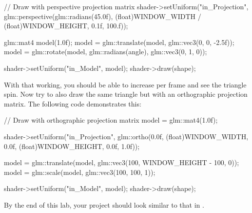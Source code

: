 \documentclass[10pt]{article}
\begin{document}
\begin{Code}

// Draw with perspective projection matrix
shader->setUniform("in_Projection", glm::perspective(glm::radians(45.0f),
 (float)WINDOW_WIDTH / (float)WINDOW_HEIGHT, 0.1f, 100.f));

glm::mat4 model(1.0f);
model = glm::translate(model, glm::vec3(0, 0, -2.5f));
model = glm::rotate(model, glm::radians(angle), glm::vec3(0, 1, 0));

shader->setUniform("in_Model", model);
shader->draw(shape);

\end{Code}


With that working, you should be able to increase  per frame
and see the triangle spin. Now try to also draw the same triangle but with
an orthographic projection matrix.  The following code demonstrates this:

\begin{Code}

// Draw with orthographic projection matrix
model = glm::mat4(1.0f);

shader->setUniform("in_Projection", glm::ortho(0.0f,
  (float)WINDOW_WIDTH, 0.0f, (float)WINDOW_HEIGHT, 0.0f, 1.0f));

model = glm::translate(model, glm::vec3(100, WINDOW_HEIGHT - 100, 0));
model = glm::scale(model, glm::vec3(100, 100, 1));

shader->setUniform("in_Model", model);
shader->draw(shape);

\end{Code}

By the end of this lab, your project should look similar to that in .

\end{document}
